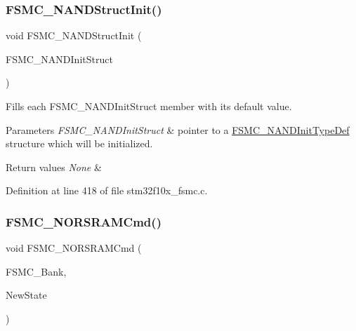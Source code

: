 \subsubsection{\texorpdfstring{F\+S\+M\+C\+\_\+\+N\+A\+N\+D\+Struct\+Init()}{FSMC\_NANDStructInit()}}
{\footnotesize\ttfamily void F\+S\+M\+C\+\_\+\+N\+A\+N\+D\+Struct\+Init (\begin{DoxyParamCaption}\item[{\hyperlink{struct_f_s_m_c___n_a_n_d_init_type_def}{F\+S\+M\+C\+\_\+\+N\+A\+N\+D\+Init\+Type\+Def} $\ast$}]{F\+S\+M\+C\+\_\+\+N\+A\+N\+D\+Init\+Struct }\end{DoxyParamCaption})}



Fills each F\+S\+M\+C\+\_\+\+N\+A\+N\+D\+Init\+Struct member with its default value. 


\begin{DoxyParams}{Parameters}
{\em F\+S\+M\+C\+\_\+\+N\+A\+N\+D\+Init\+Struct} & pointer to a \hyperlink{struct_f_s_m_c___n_a_n_d_init_type_def}{F\+S\+M\+C\+\_\+\+N\+A\+N\+D\+Init\+Type\+Def} structure which will be initialized. \\
\hline
\end{DoxyParams}

\begin{DoxyRetVals}{Return values}
{\em None} & \\
\hline
\end{DoxyRetVals}


Definition at line 418 of file stm32f10x\+\_\+fsmc.\+c.

\mbox{\label{group___f_s_m_c___private___functions_gaf943f0f2680168d3a95a3c2c9f3eca2a}} 
\subsubsection{\texorpdfstring{F\+S\+M\+C\+\_\+\+N\+O\+R\+S\+R\+A\+M\+Cmd()}{FSMC\_NORSRAMCmd()}}
{\footnotesize\ttfamily void F\+S\+M\+C\+\_\+\+N\+O\+R\+S\+R\+A\+M\+Cmd (\begin{DoxyParamCaption}\item[{uint32\+\_\+t}]{F\+S\+M\+C\+\_\+\+Bank,  }\item[{\hyperlink{group___exported__types_gac9a7e9a35d2513ec15c3b537aaa4fba1}{Functional\+State}}]{New\+State }\end{DoxyParamCaption})}



